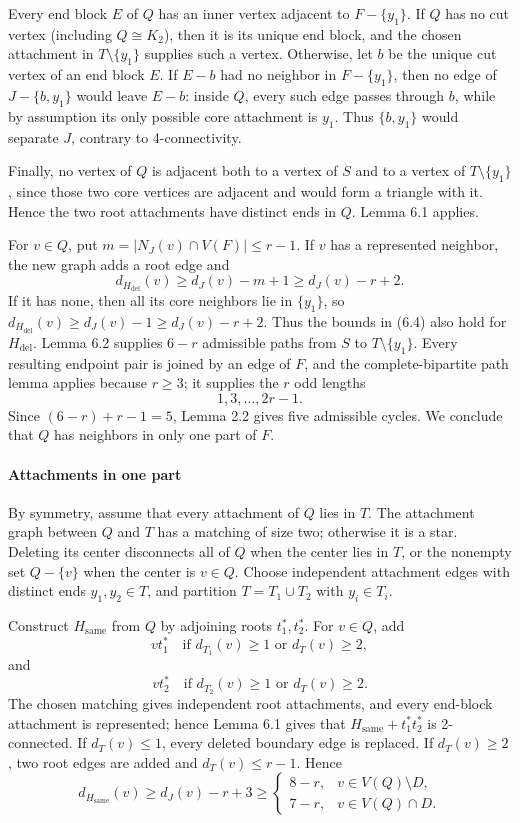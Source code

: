 \documentclass[
  11pt]{article}
\begin{document}

Every end block \(E\) of \(Q\) has an inner vertex adjacent to
\(F-\{y_1\}\). If \(Q\) has no cut vertex (including \(Q\cong K_2\)),
then it is its unique end block, and the chosen attachment in
\(T\setminus\{y_1\}\) supplies such a vertex. Otherwise, let \(b\) be
the unique cut vertex of an end block \(E\). If \(E-b\) had no neighbor
in \(F-\{y_1\}\), then no edge of \(J-\{b,y_1\}\) would leave \(E-b\):
inside \(Q\), every such edge passes through \(b\), while by assumption
its only possible core attachment is \(y_1\). Thus \(\{b,y_1\}\) would
separate \(J\), contrary to 4-connectivity.

Finally, no vertex of \(Q\) is adjacent both to a vertex of \(S\) and to
a vertex of \(T\setminus\{y_1\}\), since those two core vertices are
adjacent and would form a triangle with it. Hence the two root
attachments have distinct ends in \(Q\). Lemma 6.1 applies.

For \(v\in Q\), put \(m=|N_J(v)\cap V(F)|\le r-1\). If \(v\) has a
represented neighbor, the new graph adds a root edge and \[
 d_{H_{\mathrm{del}}}(v)\ge d_J(v)-m+1\ge d_J(v)-r+2.
\] If it has none, then all its core neighbors lie in \(\{y_1\}\), so
\(d_{H_{\mathrm{del}}}(v)\ge d_J(v)-1\ge d_J(v)-r+2\). Thus the bounds
in (6.4) also hold for \(H_{\mathrm{del}}\). Lemma 6.2 supplies \(6-r\)
admissible paths from \(S\) to \(T\setminus\{y_1\}\). Every resulting
endpoint pair is joined by an edge of \(F\), and the complete-bipartite
path lemma applies because \(r\ge3\); it supplies the \(r\) odd lengths
\[
 1,3,\ldots,2r-1.
\] Since \((6-r)+r-1=5\), Lemma 2.2 gives five admissible cycles. We
conclude that \(Q\) has neighbors in only one part of \(F\).

\paragraph{Attachments in one part}\label{attachments-in-one-part}

By symmetry, assume that every attachment of \(Q\) lies in \(T\). The
attachment graph between \(Q\) and \(T\) has a matching of size two;
otherwise it is a star. Deleting its center disconnects all of \(Q\)
when the center lies in \(T\), or the nonempty set \(Q-\{v\}\) when the
center is \(v\in Q\). Choose independent attachment edges with distinct
ends \(y_1,y_2\in T\), and partition \(T=T_1\cup T_2\) with
\(y_i\in T_i\).

Construct \(H_{\mathrm{same}}\) from \(Q\) by adjoining roots
\(t_1^*,t_2^*\). For \(v\in Q\), add \[
 vt_1^*\quad\text{if }d_{T_1}(v)\ge1\text{ or }d_T(v)\ge2,
\] and \[
 vt_2^*\quad\text{if }d_{T_2}(v)\ge1\text{ or }d_T(v)\ge2.
\] The chosen matching gives independent root attachments, and every
end-block attachment is represented; hence Lemma 6.1 gives that
\(H_{\mathrm{same}}+t_1^*t_2^*\) is 2-connected. If \(d_T(v)\le1\),
every deleted boundary edge is replaced. If \(d_T(v)\ge2\), two root
edges are added and \(d_T(v)\le r-1\). Hence \[
 d_{H_{\mathrm{same}}}(v)\ge d_J(v)-r+3
 \ge
 \begin{cases}
  8-r,&v\in V(Q)\setminus D,\\
  7-r,&v\in V(Q)\cap D.
 \end{cases} \tag{6.5}
\]
\end{document}
